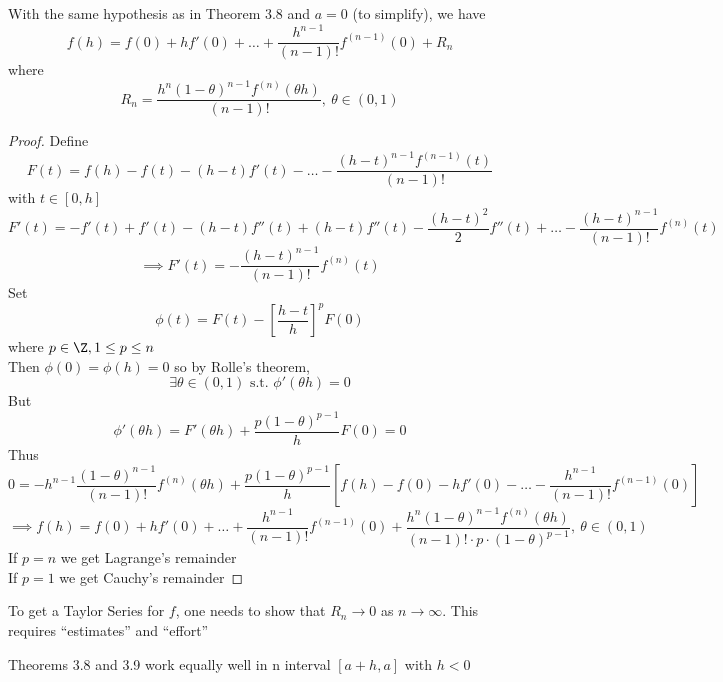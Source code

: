 \begin{theorem}
With the same hypothesis as in Theorem 3.8 and $a=0$ (to simplify), we have
\[f(h) = f(0) + hf'(0) + \dots + \frac{h^{n-1}}{(n-1)!}f^{(n-1)}(0) + R_n\]
where
\[R_n = \frac{h^n(1-\theta)^{n-1}f^{(n)}(\theta h)}{(n-1)!}, \ \theta \in (0,1)\]
\begin{proof}
Define
\[F(t) = f(h) - f(t) - (h-t)f'(t) - \dots - \frac{(h-t)^{n-1} f^{(n-1)}(t)}{(n-1)!}\]
with $t\in [0,h]$
\[F'(t) = -f'(t) + f'(t) - (h-t)f''(t) + (h-t)f''(t)-\frac{(h-t)^2}{2}f''(t) + \dots - \frac{(h-t)^{n-1}}{(n-1)!}f^{(n)}(t)\]
\[\implies F'(t) = -\frac{(h-t)^{n-1}}{(n-1)!}f^{(n)}(t)\]
Set
\[\phi(t) = F(t) - \left[\frac{h-t}{h}\right]^pF(0)\]
where $p\in \Z, 1\leq p\leq n$\\
Then $\phi(0) = \phi(h) = 0$ so by Rolle's theorem,
\[\exists \theta \in (0,1)\text{ s.t. }\phi'(\theta h) = 0\]
But
\[\phi'(\theta h) = F'(\theta h) + \frac{p(1-\theta)^{p-1}}{h}F(0)=0\]
Thus
\[0 = -h^{n-1}\frac{(1-\theta)^{n-1}}{(n-1)!}f^{(n)}(\theta h) + \frac{p(1-\theta)^{p-1}}{h}\left[f(h) - f(0)-hf'(0)-\dots-\frac{h^{n-1}}{(n-1)!}f^{(n-1)}(0)\right]\]
\[\implies f(h) = f(0) + hf'(0) + \dots + \frac{h^{n-1}}{(n-1)!}f^{(n-1)}(0) + \frac{h^n(1-\theta)^{n-1}f^{(n)}(\theta h)}{(n-1)!\cdot p\cdot (1-\theta)^{p-1}}, \ \theta \in (0,1)\]
If $p=n$ we get Lagrange's remainder\\
If $p=1$ we get Cauchy's remainder
\end{proof}
\end{theorem}
\begin{method}
To get a Taylor Series for $f$, one needs to show that $R_n\to 0$ as $n\to \infty$. This requires ``estimates'' and ``effort''
\end{method}
\begin{remark}
Theorems 3.8 and 3.9 work equally well in n interval $[a+h,a]$ with $h<0$
\end{remark}
